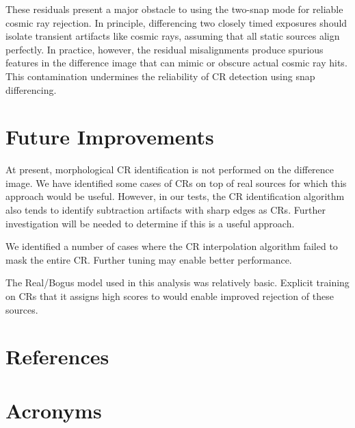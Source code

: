 \documentclass[DM,lsstdraft,authoryear,toc]{lsstdoc}
\begin{document}
These residuals present a major obstacle to using the two-snap mode for reliable cosmic ray rejection. 
In principle, differencing two closely timed exposures should isolate transient artifacts like cosmic rays, assuming that all static sources align perfectly. 
In practice, however, the residual misalignments produce spurious features in the difference image that can mimic or obscure actual cosmic ray hits. 
This contamination undermines the reliability of CR detection using snap differencing.


\section{Future Improvements}

At present, morphological CR identification is not performed on the difference image.
We have identified some cases of CRs on top of real sources for which this approach would be useful.  
However, in our tests, the CR identification algorithm also tends to identify subtraction artifacts with sharp edges as CRs.
Further investigation will be needed to determine if this is a useful approach.

We identified a number of cases where the CR interpolation algorithm failed to mask the entire CR.
Further tuning may enable better performance.

The Real/Bogus model used in this analysis was relatively basic.
Explicit training on CRs that it assigns high scores to would enable improved rejection of these sources.


\appendix
\section{References} \label{sec:bib}
\renewcommand{\refname}{} %


\section{Acronyms} \label{sec:acronyms}

\end{document}
